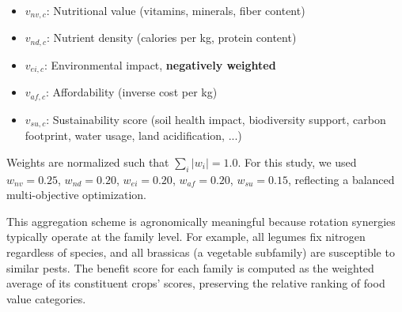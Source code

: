\documentclass{oqireport}
\begin{document}
\begin{itemize}
    \item $v_{nv,c}$: Nutritional value (vitamins, minerals, fiber content)
    \item $v_{nd,c}$: Nutrient density (calories per kg, protein content)
    \item $v_{ei,c}$: Environmental impact, \textbf{negatively weighted}
    \item $v_{af,c}$: Affordability (inverse cost per kg)
    \item $v_{su,c}$: Sustainability score (soil health impact, biodiversity support, carbon footprint, water usage, land acidification, ...)
\end{itemize}

Weights are normalized such that $\sum_i |w_i| = 1.0$. For this study, we used $w_{nv} = 0.25$, $w_{nd} = 0.20$, $w_{ei} = 0.20$, $w_{af} = 0.20$, $w_{su} = 0.15$, reflecting a balanced multi-objective optimization.







This aggregation scheme is agronomically meaningful because rotation synergies typically operate at the family level. For example, all legumes fix nitrogen regardless of species, and all brassicas (a vegetable subfamily) are susceptible to similar pests. The benefit score for each family is computed as the weighted average of its constituent crops' scores, preserving the relative ranking of food value categories.
\end{document}
